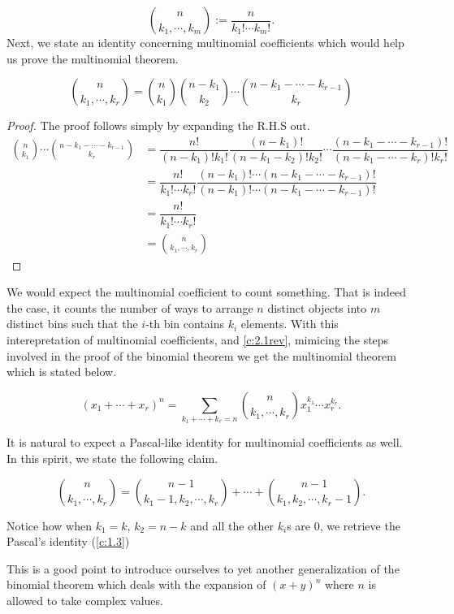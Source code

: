 \[\binom{n}{k_1,\cdots,k_m} := \frac{n}{k_1!\cdots k_m!}.\]
Next, we state an identity concerning multinomial coefficients which would help us prove the multinomial theorem. 
\begin{claim}
\[
\binom{n}{k_{1},\cdots,k_{r}} = \binom{n}{k_{1}}\binom{n-k_{1}}{k_{2}} \cdots \binom{n-k_{1}-\cdots-k_{r-1}}{k_{r}}
\]
\label{c:2.1rev}
\end{claim}
\begin{proof}
The proof follows simply by expanding the R.H.S out.
\begin{align*}
\binom{n}{k_{1}}\cdots \binom{n-k_{1}-\cdots-k_{r-1}}{k_{r}} &= \dfrac{n!}{(n-k_1)!k_1!}\dfrac{(n-k_1)!}{(n-k_1-k_2)!k_2!} \cdots \dfrac{(n-k_1-\cdots-k_{r-1})!}{(n-k_1-\cdots-k_{r})!k_r!} \\
&= \dfrac{n!}{k_1!\cdots k_r!}\dfrac{(n-k_1)!\cdots (n-k_1-\cdots-k_{r-1})!}{(n-k_1)!\cdots (n-k_1-\cdots-k_{r-1})!} \\
&=\dfrac{n!}{k_1!\cdots k_r!} \\
&=\binom{n}{k_1,\cdots,k_r}
\end{align*}
\end{proof}
We would expect the multinomial coefficient to count something. That is indeed the case, it counts the number of ways to arrange $n$ distinct objects into $m$ distinct bins such that the $i$-th bin contains $k_i$ elements. With this interepretation of multinomial coefficients, and \cref{c:2.1rev}, mimicing the steps involved in the proof of the binomial theorem we get the multinomial theorem which is stated below. 
\begin{theorem}
	\[
	(x_{1}+\cdots+x_{r})^n = \sum_{k_{1}+\cdots+k_{r}=n}\binom{n}{k_{1},\cdots,k_{r}}x_{1}^{k_{1}}\cdots x_{r}^{k_{r}}
	.\] 
\end{theorem}
It is natural to expect a Pascal-like identity for multinomial coefficients as well. In this spirit, we state the following claim.
\begin{claim}
	\[
		\binom{n}{k_{1},\cdots,k_{r}} = \binom{n-1}{k_1-1,k_2,\cdots,k_r} + \cdots + \binom{n-1}{k_1,k_2,\cdots,k_r-1}
	.\]
\end{claim}
\begin{remark}
Notice how when $k_1=k$, $k_2=n-k$ and all the other $k_i$s are $0$, we retrieve the Pascal's identity (\cref{c:1.3})    
\end{remark}
This is a good point to introduce ourselves to yet another generalization of the binomial theorem which deals with the expansion of $(x+y)^n$ where $n$ is allowed to take complex values. 
